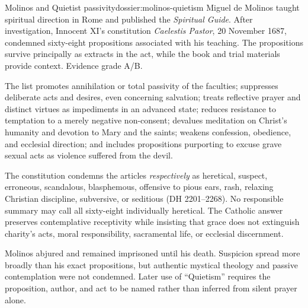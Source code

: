 \begin{heresydossier}{Molinos and Quietist passivity}{dossier:molinos-quietism}
\objectfield Miguel de Molinos taught spiritual direction in Rome and published the \emph{Spiritual Guide}. After investigation, Innocent XI's constitution \emph{Caelestis Pastor}, 20 November 1687, condemned sixty-eight propositions associated with his teaching. The propositions survive principally as extracts in the act, while the book and trial materials provide context. Evidence grade A/B.

\propositionfield The list promotes annihilation or total passivity of the faculties; suppresses deliberate acts and desires, even concerning salvation; treats reflective prayer and distinct virtues as impediments in an advanced state; reduces resistance to temptation to a merely negative non-consent; devalues meditation on Christ's humanity and devotion to Mary and the saints; weakens confession, obedience, and ecclesial direction; and includes propositions purporting to excuse grave sexual acts as violence suffered from the devil.

\responsefield The constitution condemns the articles \emph{respectively} as heretical, suspect, erroneous, scandalous, blasphemous, offensive to pious ears, rash, relaxing Christian discipline, subversive, or seditious (DH 2201--2268). No responsible summary may call all sixty-eight individually heretical. The Catholic answer preserves contemplative receptivity while insisting that grace does not extinguish charity's acts, moral responsibility, sacramental life, or ecclesial discernment.

\aftermathfield Molinos abjured and remained imprisoned until his death. Suspicion spread more broadly than his exact propositions, but authentic mystical theology and passive contemplation were not condemned. Later use of ``Quietism'' requires the proposition, author, and act to be named rather than inferred from silent prayer alone.
\end{heresydossier}

